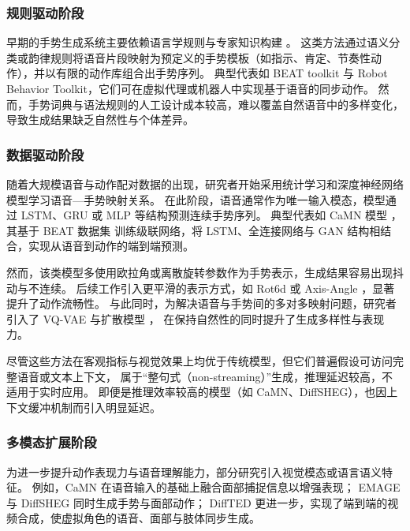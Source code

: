 \subsubsection{规则驱动阶段}

早期的手势生成系统主要依赖语言学规则与专家知识构建 \cite{behavior_expression_animation_toolkit,robot_behavior_toolkit,gesture_generation_by_imitation,gesture_and_speech_in_interaction}。
这类方法通过语义分类或韵律规则将语音片段映射为预定义的手势模板（如指示、肯定、节奏性动作），并以有限的动作库组合出手势序列。
典型代表如 BEAT toolkit 与 Robot Behavior Toolkit，它们可在虚拟代理或机器人中实现基于语音的同步动作。
然而，手势词典与语法规则的人工设计成本较高，难以覆盖自然语音中的多样变化，导致生成结果缺乏自然性与个体差异。

\subsubsection{数据驱动阶段}

随着大规模语音与动作配对数据的出现，研究者开始采用统计学习和深度神经网络模型学习语音—手势映射关系。
在此阶段，语音通常作为唯一输入模态，模型通过 LSTM、GRU 或 MLP 等结构预测连续手势序列。
典型代表如 CaMN 模型 \cite{beatcamn}，其基于 BEAT 数据集 \cite{beatcamn} 训练级联网络，将 LSTM、全连接网络与 GAN 结构相结合，实现从语音到动作的端到端预测。

然而，该类模型多使用欧拉角或离散旋转参数作为手势表示，生成结果容易出现抖动与不连续。
后续工作引入更平滑的表示方式，如 Rot6d \cite{rot6d,emage,AMUSE2024} 或 Axis-Angle \cite{diffsheg}，显著提升了动作流畅性。
与此同时，为解决语音与手势间的多对多映射问题，研究者引入了 VQ-VAE \cite{emage,zhang2024SemanticGesticulator} 与扩散模型 \cite{tamingDiffgesture,diffsheg,diffstylegesture,DiffTED2024,diffusion-self-supervised2023}，
在保持自然性的同时提升了生成多样性与表现力。

尽管这些方法在客观指标与视觉效果上均优于传统模型，但它们普遍假设可访问完整语音或文本上下文，
属于“整句式（non-streaming）”生成，推理延迟较高，不适用于实时应用。
即便是推理效率较高的模型（如 CaMN、DiffSHEG），也因上下文缓冲机制而引入明显延迟。

\subsubsection{多模态扩展阶段}

为进一步提升动作表现力与语音理解能力，部分研究引入视觉模态或语言语义特征。
例如，CaMN \cite{beatcamn} 在语音输入的基础上融合面部捕捉信息以增强表现；
EMAGE \cite{emage} 与 DiffSHEG \cite{diffsheg} 同时生成手势与面部动作；
DiffTED \cite{DiffTED2024} 更进一步，实现了端到端的视频合成，使虚拟角色的语音、面部与肢体同步生成。

